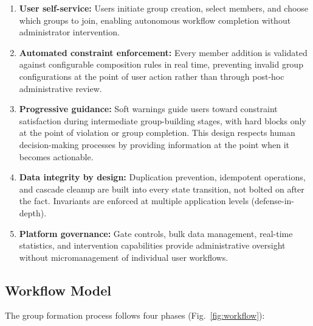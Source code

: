 \documentclass[11pt,a4paper]{article}
\theoremstyle{plain}
\theoremstyle{definition}
\theoremstyle{remark}
\begin{document}
\begin{enumerate}[noitemsep,topsep=4pt]
    \item \textbf{User self-service:} Users initiate group creation, select members, and choose which groups to join, enabling autonomous workflow completion without administrator intervention.
    \item \textbf{Automated constraint enforcement:} Every member addition is validated against configurable composition rules in real time, preventing invalid group configurations at the point of user action rather than through post-hoc administrative review.
    \item \textbf{Progressive guidance:} Soft warnings guide users toward constraint satisfaction during intermediate group-building stages, with hard blocks only at the point of violation or group completion. This design respects human decision-making processes by providing information at the point when it becomes actionable.
    \item \textbf{Data integrity by design:} Duplication prevention, idempotent operations, and cascade cleanup are built into every state transition, not bolted on after the fact. Invariants are enforced at multiple application levels (defense-in-depth).
    \item \textbf{Platform governance:} Gate controls, bulk data management, real-time statistics, and intervention capabilities provide administrative oversight without micromanagement of individual user workflows.
\end{enumerate}

\subsection{Workflow Model}

The group formation process follows four phases (Fig.~\ref{fig:workflow}):
\end{document}
